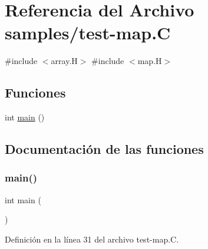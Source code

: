 \hypertarget{test-map_8_c}{}\section{Referencia del Archivo samples/test-\/map.C}
\label{test-map_8_c}
{\ttfamily \#include $<$array.\+H$>$}\newline
{\ttfamily \#include $<$map.\+H$>$}\newline
\subsection*{Funciones}
\begin{DoxyCompactItemize}
\item 
int \hyperlink{test-map_8_c_ae66f6b31b5ad750f1fe042a706a4e3d4}{main} ()
\end{DoxyCompactItemize}


\subsection{Documentación de las funciones}
\mbox{\label{test-map_8_c_ae66f6b31b5ad750f1fe042a706a4e3d4}} 
\subsubsection{\texorpdfstring{main()}{main()}}
{\footnotesize\ttfamily int main (\begin{DoxyParamCaption}{ }\end{DoxyParamCaption})}



Definición en la línea 31 del archivo test-\/map.\+C.

